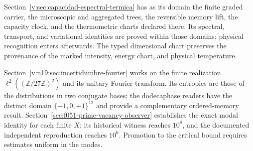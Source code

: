 Section~\ref{v:sec:capacidad-espectral-termica} has as its domain the finite
graded carrier, the microscopic and aggregated trees, the reversible memory
lift, the capacity clock, and the thermometric charts declared there. Its
spectral, transport, and variational identities are proved within those
domains; physical recognition enters afterwards. The typed dimensional
chart preserves the provenance of the marked intensity, energy chart, and
physical temperature.

Section~\ref{v:n19:sec:incertidumbre-fourier} works on the finite
realization \(\ell^2((\mathbb Z/27\mathbb Z)^2)\) and its unitary Fourier
transform. Its entropies are those of the distributions in two conjugate
bases; the dodecaphase readers have the distinct domain
\(\{-1,0,+1\}^{12}\) and provide a complementary ordered-memory result.
Section~\ref{sec:f051-prime-vacancy-observer} establishes the exact modal
identity for each finite \(X\); its historical witness reaches \(10^8\),
and the documented independent reproduction reaches \(10^6\). Promotion
to the critical bound requires estimates uniform in the modes.
